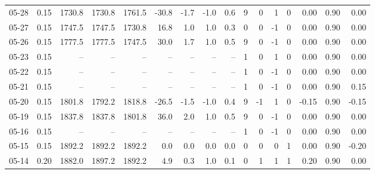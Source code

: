 \begin{threeparttable}
{\begin{tabular}{lrrrrrrrrrrrrrrr}
  05-28 &     0.15 & 1730.8 & 1730.8 & 1761.5 &      -30.8 &           -1.7 &                     -1.0 &                 0.6 &              9 &         0 &     1 &         0 &       0.00 &      0.90 &           0.00 \\
  05-27 &     0.15 & 1747.5 & 1747.5 & 1730.8 &       16.8 &            1.0 &                      1.0 &                 0.3 &              0 &         0 &    -1 &         0 &       0.00 &      0.90 &           0.00 \\
  05-26 &     0.15 & 1777.5 & 1777.5 & 1747.5 &       30.0 &            1.7 &                      1.0 &                 0.5 &              9 &         0 &    -1 &         0 &       0.00 &      0.90 &           0.00 \\
  05-23 &     0.15 &     -- &     -- &     -- &         -- &             -- &                       -- &                  -- &              1 &         0 &     1 &         0 &       0.00 &      0.90 &           0.00 \\
  05-22 &     0.15 &     -- &     -- &     -- &         -- &             -- &                       -- &                  -- &              1 &         0 &    -1 &         0 &       0.00 &      0.90 &           0.00 \\
  05-21 &     0.15 &     -- &     -- &     -- &         -- &             -- &                       -- &                  -- &              1 &         0 &    -1 &         0 &       0.00 &      0.90 &           0.15 \\
  05-20 &     0.15 & 1801.8 & 1792.2 & 1818.8 &      -26.5 &           -1.5 &                     -1.0 &                 0.4 &              9 &        -1 &     1 &         0 &      -0.15 &      0.90 &          -0.15 \\
  05-19 &     0.15 & 1837.8 & 1837.8 & 1801.8 &       36.0 &            2.0 &                      1.0 &                 0.5 &              9 &         0 &    -1 &         0 &       0.00 &      0.90 &           0.00 \\
  05-16 &     0.15 &     -- &     -- &     -- &         -- &             -- &                       -- &                  -- &              1 &         0 &    -1 &         0 &       0.00 &      0.90 &           0.00 \\
  05-15 &     0.15 & 1892.2 & 1892.2 & 1892.2 &        0.0 &            0.0 &                      0.0 &                 0.0 &              0 &         0 &     0 &         1 &       0.00 &      0.90 &          -0.20 \\
  05-14 &     0.20 & 1882.0 & 1897.2 & 1892.2 &        4.9 &            0.3 &                      1.0 &                 0.1 &              0 &         1 &     1 &         1 &       0.20 &      0.90 &           0.00 \\

\end{tabular}}
\end{threeparttable}
